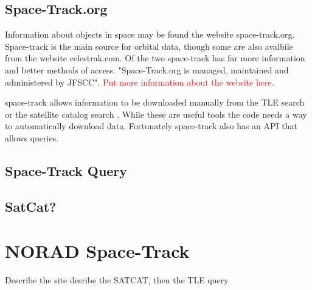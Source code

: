 \documentclass[12pt]{report}
\begin{document}
	\subsection{Space-Track.org}
	Information about objects in space may be found the website space-track.org. Space-track is the main source for orbital data, though some are also avalbile from the website celestrak.com. Of the two space-track has far more information and better methods of access.  "Space-Track.org is managed, maintained and administered by JFSCC"\cite{SpaceTrackLegend}.   \textcolor{red}{Put more information about the website here}.\par 
	space-track allows information to be downloaded manually from the TLE search \cite{SpaceTrackTLE} or the satellite catalog search \cite{SpaceTrackSATCAT}. While these are useful tools the code needs a way to automatically download data. Fortunately space-track also has an API that allows queries. 
	\subsection{Space-Track Query}
	\subsection{SatCat?}
	\section{NORAD Space-Track}	
	Describe the site
	desribe the SATCAT, then the TLE query
	
	
	
	
\end{document}
